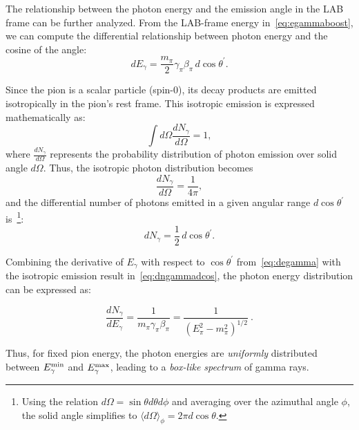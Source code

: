 
The relationship between the photon energy and the emission angle in the LAB frame can be further analyzed. From the LAB-frame energy in~\ref{eq:egammaboost}, we can compute the differential relationship between photon energy and the cosine of the angle:
\begin{equation}\label{eq:degamma}
dE_\gamma = \frac{m_\pi}{2} \gamma_\pi \beta_\pi \, d\!\cos \theta^\prime.
\end{equation}

Since the pion is a scalar particle (spin-0), its decay products are emitted isotropically in the pion’s rest frame. This isotropic emission is expressed mathematically as:
\begin{equation}
\int d\Omega \frac{dN_\gamma}{d\Omega} = 1,
\end{equation}
where \(\frac{dN_\gamma}{d\Omega}\) represents the probability distribution of photon emission over solid angle \(d\Omega\).  
%
Thus, the isotropic photon distribution becomes
\begin{equation}
\frac{dN_\gamma}{d\Omega} = \frac{1}{4\pi},
\end{equation}
%
and the differential number of photons emitted in a given angular range \(d\cos\theta^\prime\) is~\footnote{Using the relation \(d\Omega = \sin \theta d\theta d\phi\) and averaging over the azimuthal angle \(\phi\), the solid angle simplifies to \(\langle d\Omega \rangle_\phi = 2\pi d\cos\theta\).}:
\begin{equation}\label{eq:dngammadcos}
dN_\gamma = \frac{1}{2} \, d\cos\theta^\prime.
\end{equation}

Combining the derivative of \(E_\gamma\) with respect to \(\cos \theta^\prime\) from~\ref{eq:degamma} with the isotropic emission result in~\ref{eq:dngammadcos}, the photon energy distribution can be expressed as:
%
\begin{remark}
\begin{equation}
\frac{dN_\gamma}{dE_\gamma} = \frac{1}{m_\pi \gamma_\pi \beta_\pi} = \frac{1}{(E_\pi^2 - m_\pi^2)^{1/2}}~.
\end{equation}
\end{remark}
%
Thus, for fixed pion energy, the photon energies are \emph{uniformly} distributed between \(E_\gamma^{\rm min}\) and \(E_\gamma^{\rm max}\), leading to a \emph{box-like spectrum} of gamma rays.  

